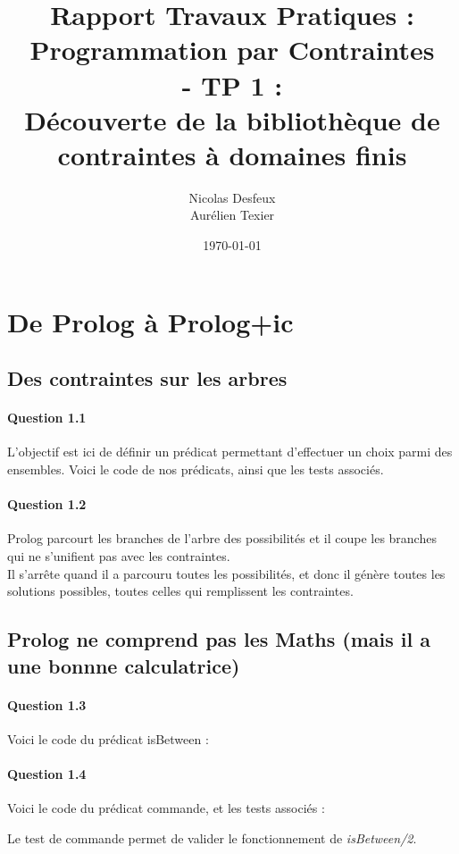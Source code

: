 \documentclass[11pt]{article} %
\date{\today}
\title{Rapport Travaux Pratiques : \\Programmation par Contraintes\\ - TP 1 : \\\textbf{Découverte de la bibliothèque de contraintes à domaines finis}}
\author{Nicolas Desfeux\\Aurélien Texier}
\begin{document}
\lstset{language=Prolog,breaklines=true,numbers=left,basicstyle=\footnotesize ,numberstyle=\footnotesize}
\maketitle
\tableofcontents
\newpage
\section{De Prolog à Prolog+ic}
\subsection{Des contraintes sur les arbres}
\paragraph{Question 1.1}
L'objectif est  ici de définir un prédicat permettant d'effectuer un choix parmi des ensembles. Voici le code de nos prédicats, ainsi que les tests associés.

\paragraph{Question 1.2}
Prolog parcourt les branches de l'arbre des possibilités et il coupe les branches qui ne
s'unifient pas avec les contraintes.\\
Il s'arrête quand il a parcouru toutes les possibilités, et donc il génère toutes les solutions possibles,
toutes celles qui remplissent les contraintes.
\subsection{Prolog ne comprend pas les Maths (mais il a une bonnne calculatrice)}
\paragraph{Question 1.3}
Voici le code du prédicat isBetween : 

\paragraph{Question 1.4}
Voici le code du prédicat commande, et les tests associés : 

Le test de commande permet de valider le fonctionnement de \textit{isBetween/2}.
\end{document}
